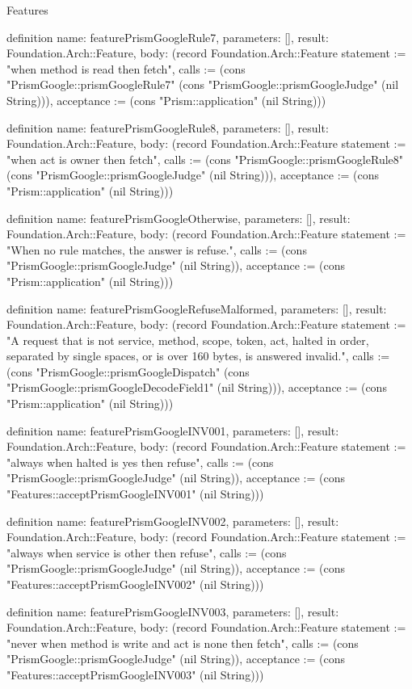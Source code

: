 \begin{lexlean}{Features}
\begin{semanticmodule}
definition{
  name: featurePrismGoogleRule7,
  parameters: [],
  result: Foundation.Arch::Feature,
  body: (record Foundation.Arch::Feature {statement := "when method is read then fetch", calls := (cons "PrismGoogle::prismGoogleRule7" (cons "PrismGoogle::prismGoogleJudge" (nil String))), acceptance := (cons "Prism::application" (nil String))})
}

definition{
  name: featurePrismGoogleRule8,
  parameters: [],
  result: Foundation.Arch::Feature,
  body: (record Foundation.Arch::Feature {statement := "when act is owner then fetch", calls := (cons "PrismGoogle::prismGoogleRule8" (cons "PrismGoogle::prismGoogleJudge" (nil String))), acceptance := (cons "Prism::application" (nil String))})
}

definition{
  name: featurePrismGoogleOtherwise,
  parameters: [],
  result: Foundation.Arch::Feature,
  body: (record Foundation.Arch::Feature {statement := "When no rule matches, the answer is refuse.", calls := (cons "PrismGoogle::prismGoogleJudge" (nil String)), acceptance := (cons "Prism::application" (nil String))})
}

definition{
  name: featurePrismGoogleRefuseMalformed,
  parameters: [],
  result: Foundation.Arch::Feature,
  body: (record Foundation.Arch::Feature {statement := "A request that is not service, method, scope, token, act, halted in order, separated by single spaces, or is over 160 bytes, is answered invalid.", calls := (cons "PrismGoogle::prismGoogleDispatch" (cons "PrismGoogle::prismGoogleDecodeField1" (nil String))), acceptance := (cons "Prism::application" (nil String))})
}

definition{
  name: featurePrismGoogleINV001,
  parameters: [],
  result: Foundation.Arch::Feature,
  body: (record Foundation.Arch::Feature {statement := "always when halted is yes then refuse", calls := (cons "PrismGoogle::prismGoogleJudge" (nil String)), acceptance := (cons "Features::acceptPrismGoogleINV001" (nil String))})
}

definition{
  name: featurePrismGoogleINV002,
  parameters: [],
  result: Foundation.Arch::Feature,
  body: (record Foundation.Arch::Feature {statement := "always when service is other then refuse", calls := (cons "PrismGoogle::prismGoogleJudge" (nil String)), acceptance := (cons "Features::acceptPrismGoogleINV002" (nil String))})
}

definition{
  name: featurePrismGoogleINV003,
  parameters: [],
  result: Foundation.Arch::Feature,
  body: (record Foundation.Arch::Feature {statement := "never when method is write and act is none then fetch", calls := (cons "PrismGoogle::prismGoogleJudge" (nil String)), acceptance := (cons "Features::acceptPrismGoogleINV003" (nil String))})
}


\end{semanticmodule}
\end{lexlean}

